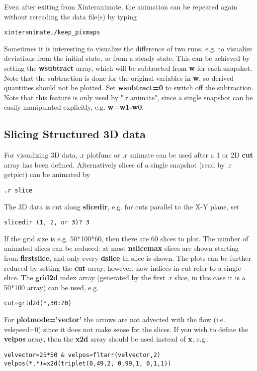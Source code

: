    Even after exiting from Xinteranimate, the animation can be repeated
   again without rereading the data file(s) by typing
\begin{verbatim}
xinteranimate,/keep_pixmaps
\end{verbatim}


   Sometimes it is interesting to visualize the difference of two runs, e.g.
   to visualize deviations from the initial state, or from a steady state.
   This can be achieved by setting the {\bf wsubtract} array, which will be 
   subtracted from {\bf w} for each snapshot. Note that the subtraction is
   done for the original variables in {\bf w}, 
   so derived quantities should not be plotted. 
   Set {\bf wsubtract=0} to switch off the subtraction.
   Note that this feature is only used by ".r animate", since a single 
   snapshot can be easily manipulated explicitly, e.g. {\bf w=w1-w0}.

\subsection{Slicing Structured 3D data \label{s-slice}}

   For visualizing 3D data, .r plotfunc or .r animate can be used after a
   1 or 2D {\bf cut} array has been defined. Alternatively slices of a single
   snapshot (read by .r getpict) can be animated by
\begin{verbatim}
.r slice
\end{verbatim}
   The 3D data is cut along {\bf slicedir}, e.g. for cuts parallel to the
   X-Y plane, set
\begin{verbatim}
slicedir (1, 2, or 3)? 3
\end{verbatim}
   If the grid size is e.g. 50$*$100$*$60, then there are 60 slices to plot.
   The number of animated slices can be reduced:
   at most {\bf nslicemax} slices are shown starting from {\bf firstslice},
   and only every {\bf dslice}-th slice is shown.
   The plots can be further reduced by setting the {\bf cut} array,
   however, now indices in cut refer to a single slice. The {\bf grid2d} 
   index array (generated by the first .r slice, in this case it is a 50$*$100 
   array) can be used, e.g.
\begin{verbatim}
cut=grid2d(*,30:70)
\end{verbatim}
   For {\bf plotmode='vector'} the arrows are not advected with the flow 
   (i.e. velspeed=0) since it does not make sense for the slices.
   If you wish to define the {\bf velpos} array, then the 
   {\bf x2d} array should be used instead of {\bf x}, e.g.:
\begin{verbatim}
velvector=25*50 & velpos=fltarr(velvector,2)
velpos(*,*)=x2d(triplet(0,49,2, 0,99,1, 0,1,1))
\end{verbatim}

